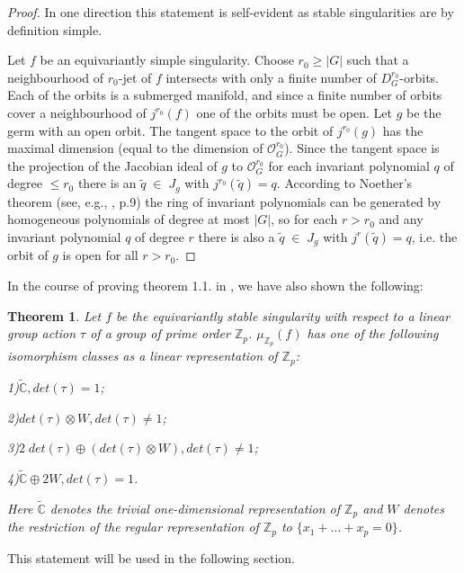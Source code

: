 \documentclass{amsart}
\newtheorem{theorem}[subsection]{Theorem}
\begin{document}
\begin{proof}
In one direction this statement is self-evident as stable singularities are by definition simple.

Let $f$ be an equivariantly simple singularity. Choose $r_0 \geq |G|$ such that a neighbourhood of $r_0$-jet of $f$ intersects with only a finite number of $D^{r_0}_G$-orbits. Each of the orbits is a submerged manifold, and since a finite number of orbits cover a neighbourhood of $j^{r_0} (f)$ one of the orbits must be open. Let $g$ be the germ with an open orbit. The tangent space to the orbit of $j^{r_0} (g)$ has the maximal dimension (equal to the dimension of $\mathcal{O}^{r_0}_{G}$). Since the tangent space is the projection of the Jacobian ideal of $g$ to  $\mathcal{O}^{r_0}_{G}$ for each invariant polynomial $q$ of degree $\leq r_0$ there is an $\tilde{q} \; \in \; J_g$ with $j^{r_0} (\tilde{q}) = q$. According to Noether's theorem (see, e.g., \cite{8}, p.9) the ring of invariant polynomials can be generated by homogeneous polynomials of degree at most $|G|$,  so for each $r>r_0$ and any invariant polynomial $q$ of degree  $r$ there is also a $\tilde{q} \; \in \; J_g$ with $j^{r} (\tilde{q}) = q$, i.e. the orbit of $g$ is open for all $r>r_0$.

\end{proof}

In the course of proving theorem 1.1. in \cite{1}, we have also shown the following:

\begin{theorem} Let $f$ be the equivariantly stable singularity with respect to a linear group action $\tau$ of a group of prime order $\mathbb{Z}_p$. $\mu_{ \mathbb{Z}_p}(f)$ has one of the following isomorphism classes as a linear representation of $\mathbb{Z}_p$:

1)$\tilde{\mathbb{C}}, det(\tau)=1$;

2)$det(\tau) \otimes W, det(\tau) \neq 1$;

3)$2 \; det(\tau) \oplus (det(\tau) \otimes W), det(\tau) \neq 1$;

4)$\tilde{\mathbb{C}} \oplus 2 W, det(\tau)=1$.

Here $\tilde{\mathbb{C}}$ denotes the trivial one-dimensional representation of $\mathbb{Z}_p$ and $W$ denotes the restriction of the regular representation of $\mathbb{Z}_p$ to $\{x_1 + \ldots + x_p=0\}$.

\end{theorem}

This statement will be used in the following section.
\end{document}
